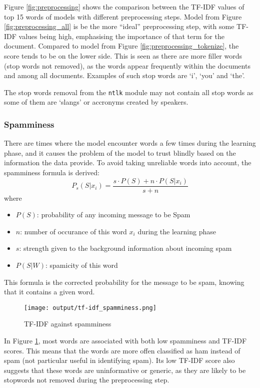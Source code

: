 Figure \ref{fig:preprocessing} shows the comparison between the TF-IDF values of top 15 words of models with different preprocessing steps. 
Model from Figure \ref{fig:preprocessing_all} is be the more ``ideal'' preprocessing step, with some TF-IDF values being high, emphasising the importance of that term for the document.
Compared to model from Figure \ref{fig:preprocessing_tokenize}, the score tends to be on the lower side. This is seen as there are more filler words (stop words not removed), as the words appear frequently within the documents and among all documents.
Examples of such stop words are `i', `you' and `the'.

The stop words removal from the \texttt{ntlk} module may not contain all stop words as some of them are `slangs' or accronyms created by speakers. 


\subsubsection{Spamminess}

There are times where the model encounter words a few times during the learning phase, and it causes the problem of the model to trust blindly based on the information the data provide. 
To avoid taking unreliable words into account, the spamminess formula is derived:
\begin{equation}
    P_s(S | x_i) = \frac{s \cdot P(S) + n \cdot P(S | x_i)}{s + n}
\end{equation}
where
\begin{itemize}
    \item $P(S)$: probability of any incoming message to be Spam
    \item $n$: number of occurance of this word $x_i$ during the learning phase
    \item $s$: strength given to the background information about incoming spam
    \item $P(S | W)$: spamicity of this word
\end{itemize}

This formula is the corrected probability for the message to be spam, knowing that it contains a given word.

\begin{figure}[h]
    \centering
    \texttt{[image: output/tf-idf\_spamminess.png]}
    \caption{TF-IDF against spamminess}
    \label{fig:tfidf-spamminess}
\end{figure}

In Figure \ref{fig:tfidf-spamminess}, most words are associated with both low spamminess and TF-IDF scores. 
This means that the words are more offen classified as ham instead of spam (not particular useful in identifying spam).
Its low TF-IDF score also suggests that these words are uninformative or generic, as they are likely to be stopwords not removed during the preprocessing step.

